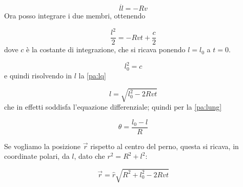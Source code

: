 \documentclass[../main.tex]{subfiles}
\begin{document}
\begin{equation}
\label{pa:sol}
l \dot l = -R v
\end{equation}
Ora posso integrare i due membri, ottenendo

\begin{equation}
\label{pa:lq}
\frac{l^2}{2}= -Rvt + \frac{c}{2}
\end{equation}
dove $c$ \`e la costante di integrazione, che si ricava ponendo $l=l_0$ a $t=0$.

\begin{equation}
\label{pa:t0}
l_0^2 = c
\end{equation}
e quindi risolvendo in $l$ la \cref{pa:lq}

\begin{equation}
\label{pa:l}
l= \sqrt{l_0^2 - 2Rvt}
\end{equation}
che in effetti soddisfa l'equazione differenziale; quindi per la \cref{pa:lung}

\begin{equation}
\theta = \frac{l_0 - l}{R}
\end{equation}

Se vogliamo la posizione $\vec r$ rispetto al centro del perno, questa si ricava, in coordinate polari, da $l$, dato che $r^2=R^2+l^2$:

\begin{equation}
\vec r = \hat r \sqrt{R^2 +l_0^2 -2Rvt}
\end{equation}
\end{document}
